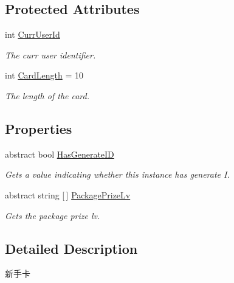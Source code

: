 \subsection*{Protected Attributes}
\begin{DoxyCompactItemize}
\item 
int \mbox{\hyperlink{class_t_net_1_1_com_1_1_generic_1_1_novice_card_aa432c24541c200d1418c9dd5c2c88d3d}{Curr\+User\+Id}}
\begin{DoxyCompactList}\small\item\em The curr user identifier. \end{DoxyCompactList}\item 
int \mbox{\hyperlink{class_t_net_1_1_com_1_1_generic_1_1_novice_card_aae34a6dd1483bfde59e5e1b81de377d8}{Card\+Length}} = 10
\begin{DoxyCompactList}\small\item\em The length of the card. \end{DoxyCompactList}\end{DoxyCompactItemize}
\subsection*{Properties}
\begin{DoxyCompactItemize}
\item 
abstract bool \mbox{\hyperlink{class_t_net_1_1_com_1_1_generic_1_1_novice_card_a6c1f693e61792492952a012eac501d54}{Has\+Generate\+ID}}
\begin{DoxyCompactList}\small\item\em Gets a value indicating whether this instance has generate I. \end{DoxyCompactList}\item 
abstract string \mbox{[}$\,$\mbox{]} \mbox{\hyperlink{class_t_net_1_1_com_1_1_generic_1_1_novice_card_a06c38204b7a0e49bf453ee0e341b2505}{Package\+Prize\+Lv}}
\begin{DoxyCompactList}\small\item\em Gets the package prize lv. \end{DoxyCompactList}\end{DoxyCompactItemize}


\subsection{Detailed Description}
新手卡 



